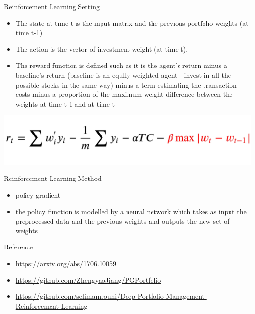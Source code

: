 \documentclass[10pt]{beamer}
\begin{document}
\begin{frame}{Reinforcement Learning Setting}
\begin{itemize}
    \item The state at time t is the input matrix and the previous portfolio weights (at time t-1)
    \item The action is the vector of investment weight (at time t).
    \item The reward function is defined such as it is the agent's return minus a baseline’s return (baseline is an eqully weighted agent - invest in all the possible stocks in the same way) minus a term estimating the transaction costs minus a proportion of the maximum weight difference between the weights at time t-1 and at time t
\end{itemize}
\includegraphics[width=\textwidth]{Figures/r_tt.jpg}
    
\end{frame}

\begin{frame}{Reinforcement Learning Method}
\begin{itemize}
    \item policy gradient 
    \item the policy function is modelled by a neural network which takes as input the preprocessed data and the previous weights and outputs the new set of weights
\end{itemize}

\end{frame}

\begin{frame}{Reference}
\begin{itemize}
    \item \href{url}{https://arxiv.org/abs/1706.10059}
    \item \href{url}{https://github.com/ZhengyaoJiang/PGPortfolio}
    \item \href{url}{https://github.com/selimamrouni/Deep-Portfolio-Management-Reinforcement-Learning}
\end{itemize}
    
\end{frame}
\end{document}
